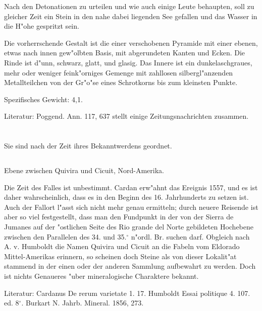 \documentclass[a4paper, 11pt, oneside]{article}
\begin{document}
Nach den Detonationen zu urteilen und wie auch einige Leute behaupten, soll zu gleicher Zeit ein Stein in den nahe dabei liegenden See gefallen und das Wasser in die H"ohe gespritzt sein.

Die vorherrschende Gestalt ist die einer verschobenen Pyramide mit einer ebenen, etwas nach innen gew"olbten Basis, mit abgerundeten Kanten und Ecken. Die Rinde ist d"unn, schwarz, glatt, und glasig. Das Innere ist ein dunkelaschgraues, mehr oder weniger feink"orniges Gemenge mit zahllosen silbergl"anzenden Metallteilchen von der Gr"o"se eines Schrotkorns bis zum kleinsten Punkte.

Spezifisches Gewicht: 4,1.

\normalsize
Literatur: Poggend. Ann. 117, 637 stellt einige Zeitungsnachrichten zusammen.
\clearpage
\section{}
\LARGE
Sie sind nach der Zeit ihres Bekanntwerdens geordnet.

\subsection{}
\LARGE
\paragraph{}
Ebene zwischen Quivira und Cicuit, Nord-Amerika.

Die Zeit des Falles ist unbestimmt. Cardan erw"ahnt das Ereignis 1557, und es ist daher wahrscheinlich, dass es in den Beginn des 16. Jahrhunderts zu setzen ist. Auch der Fallort l"asst sich nicht mehr genau ermitteln; durch neuere Reisende ist aber so viel festgestellt, dass man den Fundpunkt in der von der Sierra de Jumanes auf der "ostlichen Seite des Rio grande del Norte gebildeten Hochebene zwischen den Parallelen des 34. und 35.$^\circ$ n"ordl. Br. suchen darf. Obgleich nach A. v. Humboldt die Namen Quivira und Cicuit an die Fabeln vom Eldorado Mittel-Amerikas erinnern, so scheinen doch Steine als von dieser Lokalit"at stammend in der einen oder der anderen Sammlung aufbewahrt zu werden. Doch ist nichts Genaueres "uber mineralogische Charaktere bekannt.

\normalsize
Literatur: Cardanus De rerum varietate 1. 17. Humboldt Essai politique 4. 107. ed. 8$^\circ$. Burkart N. Jahrb. Mineral. 1856, 273.
\end{document}
